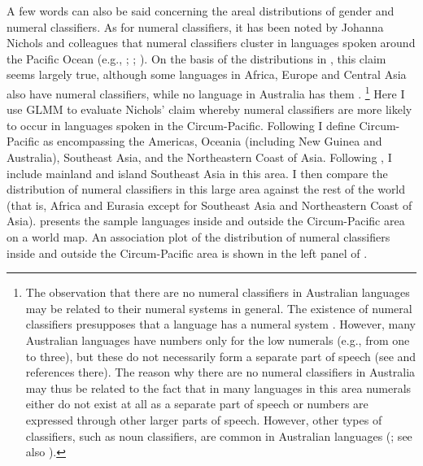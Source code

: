 \documentclass[output=collectionpaper]{langsci/langscibook}
\begin{document}
A few words can also be said concerning the areal distributions of gender and numeral classifiers. As for numeral classifiers, it has been noted by Johanna Nichols and colleagues that numeral classifiers cluster in languages spoken around the Pacific Ocean (e.g., \citealt[132--133]{Nichols1992}; \citealt[366--367]{Nichols1996}; \citealt[299]{Nichols2003}). On the basis of the distributions in , this claim seems largely true, although some languages in Africa, Europe and Central Asia also have numeral classifiers, while no language in Australia has them \citep[121--124]{Aikhenvald2000}.%
\footnote{The observation that there are no numeral classifiers in Australian languages may be related to their numeral systems in general. The existence of numeral classifiers presupposes that a language has a numeral system \citep[99]{Aikhenvald2000}. However, many Australian languages have numbers only for the low numerals (e.g., from one to three), but these do not necessarily form a separate part of speech (see \citealt[100]{Aikhenvald2000} and references there). The reason why there are no numeral classifiers in Australia may thus be related to the fact that in many languages in this area numerals either do not exist at all as a separate part of speech or numbers are expressed through other larger parts of speech. However, other types of classifiers, such as noun classifiers, are common in Australian languages (\citealt[82]{Aikhenvald2000}; see also \citealt{Plaster2007}).} %
Here I use GLMM to evaluate Nichols' claim whereby numeral classifiers are more likely to occur in languages spoken in the Circum-Pacific. Following \citet{Bickel2006} I define Circum-Pacific as encompassing the Americas, Oceania (including New Guinea and Australia), Southeast Asia, and the Northeastern Coast of Asia. Following \citet{Nichols2003}, I include mainland and island Southeast Asia in this area. I then compare the distribution of numeral classifiers in this large area against the rest of the world (that is, Africa and Eurasia except for Southeast Asia and Northeastern Coast of Asia).  presents the sample languages inside and outside the Circum-Pacific area on a world map. An association plot of the distribution of numeral classifiers inside and outside the Circum-Pacific area is shown in the left panel of .
\end{document}
